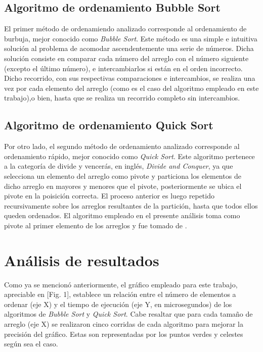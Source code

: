 \documentclass[conference]{IEEEtran}
\begin{document}
\subsection{Algoritmo de ordenamiento Bubble Sort}

El primer método de ordenamiendo analizado corresponde al ordenamiento de burbuja, mejor conocido como \textit{Bubble Sort}.
Este método es una simple e intuitiva solución al problema de acomodar ascendentemente una serie de números. 
Dicha solución consiste en comparar cada número del arreglo con el número siguiente
 (excepto el último número), e intercambiarlos si están en el orden incorrecto. Dicho recorrido, con 
sus respectivas comparaciones e intercambios, se realiza una vez por cada elemento del arreglo
 (como es el caso del algoritmo empleado en este trabajo),o bien, hasta que se realiza un recorrido completo sin intercambios.

\subsection{Algoritmo de ordenamiento Quick Sort}

Por otro lado, el segundo método de ordenamiento analizado corresponde al ordenamiento rápido, mejor conocido
como \textit{Quick Sort}. Este algoritmo pertenece a la categoría de divide y vencerás, en inglés, \textit{Divide and Conquer},
ya que selecciona un elemento del arreglo como pivote y particiona los elementos de dicho arreglo en mayores y menores que el 
pivote, posteriormente se ubica el pivote en la poisición correcta\cite{b1}. El proceso anterior es luego repetido recursivamente sobre
los arreglos resultantes de la partición, hasta que todos ellos queden ordenados. El algoritmo empleado en el presente 
análisis toma como pivote al primer elemento de los arreglos y fue tomado de \cite{b1}.\\

\section{Análisis de resultados}
Como ya se mencionó anteriormente, el gráfico empleado para este trabajo, apreciable en [Fig. 1], establece un relación entre
 el número de elementos a ordenar (eje X) y el tiempo de ejecución (eje Y, en microsegundos) de los algoritmos de
 \textit{Bubble Sort} y \textit{Quick Sort}. Cabe resaltar que para cada tamaño de arreglo (eje X) se realizaron cinco corridas de
cada algoritmo para mejorar la precisión del gráfico. Estas son representadas por los puntos verdes y celestes según sea el caso.
\end{document}

